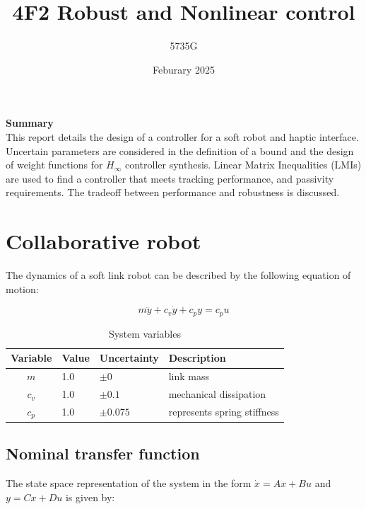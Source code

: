 \documentclass{article}
\begin{document}
\title{4F2 Robust and Nonlinear control}
\author{5735G}
\date{Feburary 2025}
\maketitle 

\begin{center}
    \textbf{Summary} \\
    This report details the design of a controller for a soft robot and haptic interface.
    Uncertain parameters are considered in the definition of a bound and the design of weight functions for $H_\infty$ controller synthesis.
    Linear Matrix Inequalities (LMIs) are used to find a controller that meets tracking performance, and passivity requirements.
    The tradeoff between performance and robustness is discussed.
\end{center}

\section{Collaborative robot}

The dynamics of a soft link robot can be described by the following equation of motion:

\begin{equation}
    m\ddot{y} + c_v \dot{y} + c_p y = c_p u
\end{equation}

\begin{table}[h]
    \centering
    \begin{tabular}{c|ll|l}
        Variable & Value & Uncertainty & Description \\
        \hline
        $m$ & 1.0 & $\pm0$ & link mass \\
        $c_v$ & 1.0 & $\pm 0.1$ & mechanical dissipation \\
        $c_p$ & 1.0 & $\pm 0.075$ & represents spring stiffness \\
    \end{tabular}
    \caption{System variables}
    \label{tab:parameters}
\end{table}

\subsection{Nominal transfer function}

The state space representation of the system in the form $\dot{x} = Ax + Bu$ and $y = Cx + Du$ is given by:
\end{document}
